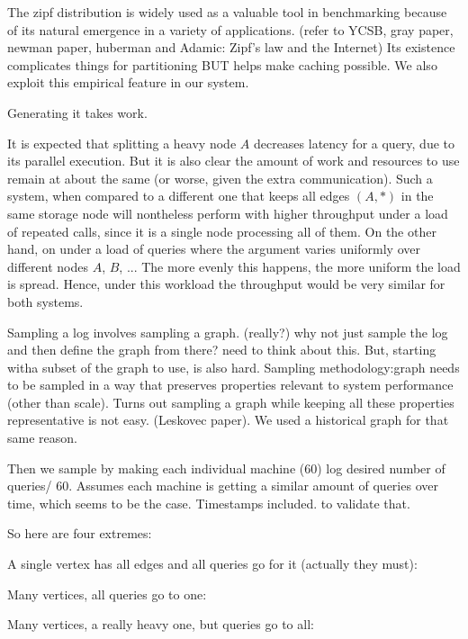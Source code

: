 \documentclass{article}
\begin{document}
The zipf distribution is widely used as a valuable tool in benchmarking because of its natural emergence in a variety of applications. (refer to YCSB, gray paper, newman paper, huberman and Adamic: 
Zipf’s law and the Internet) Its existence complicates things for partitioning BUT helps make caching possible. We also exploit this empirical feature in our system.

Generating it takes work.

It is expected that splitting a heavy node \( A \)  decreases latency for a \fanoutq[ A ] query, due to its parallel execution.  But it is also clear the amount of work and resources to use remain at about the same (or worse, given the extra communication).  Such a system, when compared to a different one that keeps all edges \( \left(A, * \right) \) in the same storage node  will nontheless perform with higher throughput under a load of repeated \fanoutq[A] calls, since it is a single node processing all of them.  On the other hand, on under a load of \fanoutq{*} queries where the argument varies uniformly over different nodes $A$, $B$, ... The more evenly this happens, the more uniform the load is spread. Hence, under this workload the throughput would be very similar for both systems.    

Sampling a log involves sampling a graph. (really?) why not just sample the log and then define the graph from there? need to think about this.
But, starting witha  subset of the graph to use,  is also hard.
Sampling methodology:graph needs to be sampled in a way that preserves properties relevant to system performance (other than scale). Turns out sampling a graph while keeping all these properties
representative is not easy. (Leskovec paper). We used a historical graph for that same reason.

Then we sample by making each individual machine (60) log desired number of queries/ 60. Assumes each machine is getting a similar amount of queries over time, which seems to be the case.
Timestamps included. to validate that.


So here are four extremes:

A single vertex has all edges and  all queries go for it (actually they must):

Many vertices, all queries go to one:

Many vertices, a really heavy one, but queries go to all:
\end{document}
